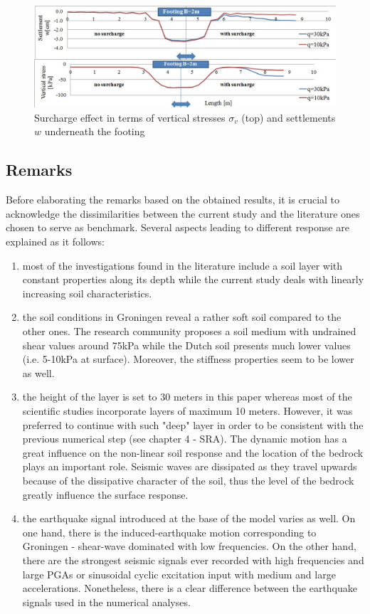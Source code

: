 	\begin{figure}[!h]
		\centering
		\includegraphics[width=0.9 \linewidth]{"surcharge"}
		\caption{Surcharge effect in terms of vertical stresses $\sigma_v$ (top) and settlements $w$ underneath the footing}
		\label{maxax}
	\end{figure}
	
\newpage
\subsection{Remarks}

Before elaborating the remarks based on the obtained results, it is crucial to acknowledge the dissimilarities between the current study and the literature ones chosen to serve as benchmark. Several aspects leading to different response are explained as it follows:
\begin{enumerate}
	\item most of the investigations found in the literature include a soil layer with constant properties along its depth while the current study deals with linearly increasing soil characteristics.
	\item the soil conditions in Groningen reveal a rather soft soil compared to the other ones. The research community proposes a soil medium with undrained shear values around 75kPa while the Dutch soil presents much lower values (i.e. 5-10kPa at surface). Moreover, the stiffness properties seem to be lower as well.
	\item the height of the layer is set to 30 meters in this paper whereas most of the scientific studies incorporate layers of maximum 10 meters. However, it was preferred to continue with such "deep" layer in order to be consistent with the previous numerical step (see chapter 4 - SRA). The dynamic motion has a great influence on the non-linear soil response and the location of the bedrock plays an important role. Seismic waves are dissipated as they travel upwards because of the dissipative character of the soil, thus the level of the bedrock greatly influence the surface response.
	\item the earthquake signal introduced at the base of the model varies as well. On one hand, there is the induced-earthquake motion corresponding to Groningen - shear-wave dominated with low frequencies. On the other hand, there are the strongest seismic signals ever recorded with high frequencies and large PGAs or sinusoidal cyclic excitation input with medium and large accelerations. Nonetheless, there is a clear difference between the earthquake signals used in the numerical analyses. 
\end{enumerate}

